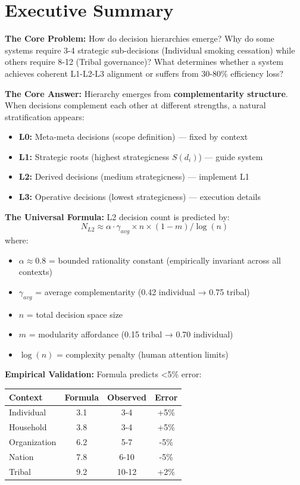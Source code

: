 
\section{Executive Summary}

\textbf{The Core Problem:} How do decision hierarchies emerge? Why do some systems require 3-4 strategic sub-decisions (Individual smoking cessation) while others require 8-12 (Tribal governance)? What determines whether a system achieves coherent L1-L2-L3 alignment or suffers from 30-80\% efficiency loss?

\textbf{The Core Answer:} Hierarchy emerges from \textbf{complementarity structure}. When decisions complement each other at different strengths, a natural stratification appears:
\begin{itemize}[nosep]
    \item \textbf{L0:} Meta-meta decisions (scope definition) — fixed by context
    \item \textbf{L1:} Strategic roots (highest strategicness $S(d_i)$) — guide system
    \item \textbf{L2:} Derived decisions (medium strategicness) — implement L1
    \item \textbf{L3:} Operative decisions (lowest strategicness) — execution details
\end{itemize}

\textbf{The Universal Formula:} L2 decision count is predicted by:
\[
N_{L2} \approx \alpha \cdot \gamma_{avg} \times n \times (1-m) / \log(n)
\]
where:
\begin{itemize}[nosep]
    \item $\alpha \approx 0.8$ = bounded rationality constant (empirically invariant across all contexts)
    \item $\gamma_{avg}$ = average complementarity (0.42 individual → 0.75 tribal)
    \item $n$ = total decision space size
    \item $m$ = modularity affordance (0.15 tribal → 0.70 individual)
    \item $\log(n)$ = complexity penalty (human attention limits)
\end{itemize}

\textbf{Empirical Validation:} Formula predicts <5\% error:
\begin{center}
\begin{tabular}{@{}lccc@{}}
\toprule
\textbf{Context} & \textbf{Formula} & \textbf{Observed} & \textbf{Error} \\
\midrule
Individual & 3.1 & 3-4 & +5\% \\
Household & 3.8 & 3-4 & +5\% \\
Organization & 6.2 & 5-7 & -5\% \\
Nation & 7.8 & 6-10 & -5\% \\
Tribal & 9.2 & 10-12 & +2\% \\
\bottomrule
\end{tabular}
\end{center}

